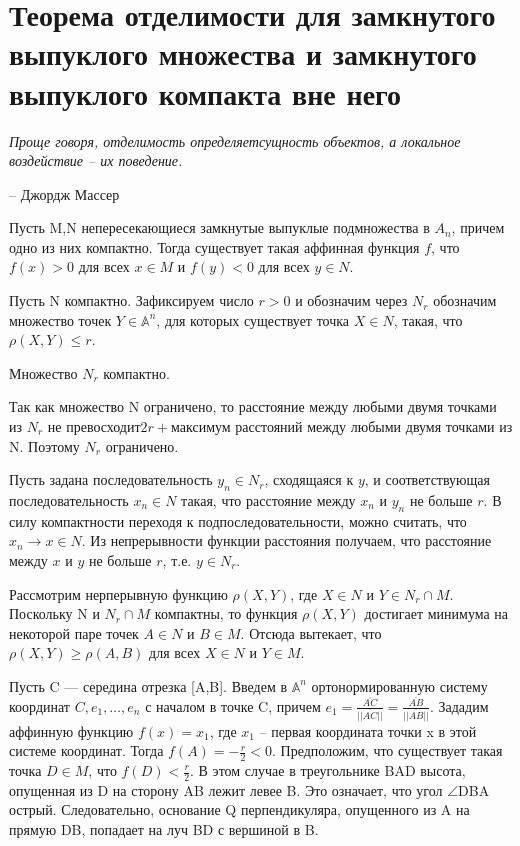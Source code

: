 \chapter{Теорема отделимости для замкнутого выпуклого множества и замкнутого
выпуклого компакта вне него}
\label{cha:2}

\epigraph{
	\textit{Проще говоря, отделимость определяетсущность объектов, а локальное воздействие – их поведение.}}
{-- Джордж Массер}

\begin{theorem}[]\label{cha:2/the:1}
	Пусть M,N непересекающиеся замкнутые выпуклые подмножества в $A_n$, причем одно из них компактно. Тогда существует такая аффинная функция $f$, что $f(x) > 0$ для всех $x\in M$ и $f(y)<0$ для всех $y\in N$.
\end{theorem}
\begin{Proof}
	Пусть N компактно. Зафиксируем число $r > 0$ и обозначим через $N_r$ обозначим множество точек $Y \in \mathbb{A}^n$, для которых существует точка $X \in N$, такая, что $\rho(X, Y) \le r$.

	\begin{lemma}\label{cha:2/lemma:1}
		Множество $N_r$ компактно.
	\end{lemma}
	\begin{Proof}
		Так как множество N ограничено, то расстояние между любыми двумя точками из $N_r$ не превосходит$2r+$максимум расстояний между любыми двумя точками из N. Поэтому $N_r$ ограничено.

		Пусть задана последовательность $y_n \in N_r$, сходящаяся к $y$, и соответствующая последовательность $x_n \in N$ такая, что расстояние между $x_n$ и $y_n$ не больше $r$. В силу компактности переходя к подпоследовательности, можно считать, что $x_n \to x \in N$. Из непрерывности функции расстояния получаем, что расстояние между $x$ и $y$ не больше $r$, т.е. $y \in N_r$.
	\end{Proof}
	Рассмотрим нерперывную функцию $\rho(X, Y)$, где $X \in N$ и $Y \in N_r \cap M$. Поскольку N и $N_r \cap M$ компактны, то функция $\rho(X, Y)$ достигает минимума на некоторой паре точек $A \in N$ и $B \in M$. Отсюда вытекает, что $\rho(X,Y)\ge \rho(A,B)$ для всех $X \in N$ и $Y \in M$.

	Пусть C — середина отрезка [A,B]. Введем в $\mathbb{A}^n$ ортонормированную систему координат $C, e_1, \dots, e_n$ с началом в точке C, причем $\displaystyle e_1 = \frac{\overline{AC}}{||\overline{AC}||} = \frac{\overline{AB}}{||\overline{AB}||}$. Зададим аффинную функцию $f(x) = x_1$, где $x_1$ – первая координата точки x в этой системе координат. Тогда $f(A) = -\frac{r}{2} < 0$. Предположим, что существует такая точка $D \in M$, что $f(D) < \frac{r}{2}$. В этом случае в треугольнике BAD высота, опущенная из D на сторону AB лежит левее B. Это означает, что угол $\angle$DBA острый. Следовательно, основание Q перпендикуляра, опущенного из A на прямую DB, попадает на луч BD с вершиной в B.


\end{Proof}

